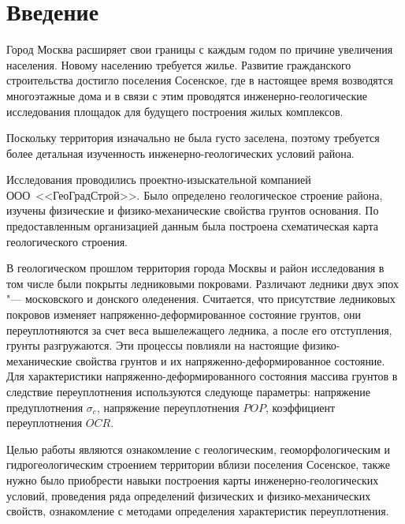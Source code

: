 \chapter*{Введение}                         %

Город Москва расширяет свои границы с каждым годом по причине увеличения населения. 
Новому населению требуется жилье. Развитие гражданского строительства достигло поселения 
Сосенское, где в настоящее время возводятся многоэтажные дома и в связи с этим проводятся 
инженерно-геологические исследования площадок для будущего построения жилых комплексов.

Поскольку территория изначально не была густо заселена, поэтому требуется более детальная 
изученность инженерно-геологических условий района.

Исследования проводились проектно-изыскательной компанией ООО~<<ГеоГрадСтрой>>. 
Было определено геологическое строение района, изучены физические и физико-механические свойства грунтов основания. 
По предоставленным организацией данным была построена схематическая карта геологического строения.

В геологическом прошлом территория города Москвы и район исследования в том числе были 
покрыты ледниковыми покровами. Различают ледники двух эпох "--- московского и донского оледенения. 
Считается, что присутствие ледниковых покровов изменяет напряженно-деформированное состояние 
грунтов, они переуплотняются за счет веса вышележащего ледника, а после его отступления, 
грунты разгружаются. Эти процессы повлияли на настоящие физико-механические свойства грунтов 
и их напряженно-деформированное состояние. Для характеристики напряженно-деформированного 
состояния массива грунтов в следствие переуплотнения используются следующе параметры:
напряжение предуплотнения $\sigma_c$, 
напряжение переуплотнения $POP$,
коэффициент переуплотнения $OCR$.

Целью работы являются ознакомление с геологическим, геоморфологическим и 
гидрогеологическим строением территории вблизи поселения Сосенское, также 
нужно было приобрести навыки построения карты инженерно-геологических 
условий, проведения ряда определений физических и физико-механических 
свойств, ознакомление с методами определения характеристик переуплотнения.

